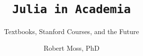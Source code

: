 \documentclass[aspectratio=169]{beamer-pytex}
\title{\texttt{Julia in Academia}}
\subtitle{Textbooks, Stanford Courses, and the Future}
\author{Robert Moss, PhD}
\institute{Stanford University | JuliaCon 2025}
\date{}
\begin{document}
\begin{frame}
    \maketitle
\end{frame}


















\end{document}
